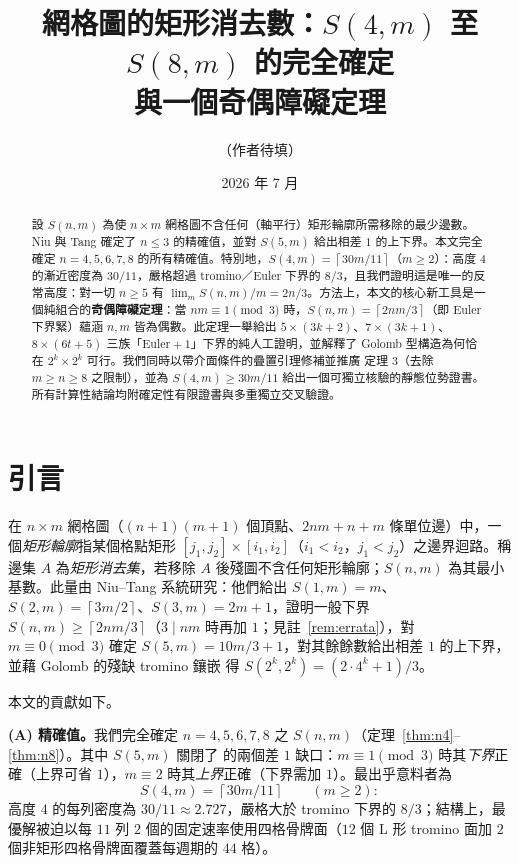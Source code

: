\documentclass[11pt]{ctexart}
\title{網格圖的矩形消去數：$S(4,m)$ 至 $S(8,m)$ 的完全確定\\與一個奇偶障礙定理}
\author{（作者待填）}
\date{2026 年 7 月}
\theoremstyle{definition}
\newcommand{\ceil}[1]{\left\lceil #1 \right\rceil}
\begin{document}
\maketitle

\begin{abstract}
設 $S(n,m)$ 為使 $n\times m$ 網格圖不含任何（軸平行）矩形輪廓所需移除的最少邊數。Niu 與 Tang \cite{NT25} 確定了 $n\le 3$ 的精確值，並對 $S(5,m)$ 給出相差 $1$ 的上下界。本文完全確定 $n=4,5,6,7,8$ 的所有精確值。特別地，$S(4,m)=\ceil{30m/11}$（$m\ge 2$）：高度 $4$ 的漸近密度為 $30/11$，嚴格超過 tromino／Euler 下界的 $8/3$，且我們證明這是唯一的反常高度：對一切 $n\ge 5$ 有 $\lim_m S(n,m)/m = 2n/3$。方法上，本文的核心新工具是一個純組合的\textbf{奇偶障礙定理}：當 $nm\equiv 1\pmod 3$ 時，$S(n,m)=\ceil{2nm/3}$（即 Euler 下界緊）蘊涵 $n,m$ 皆為偶數。此定理一舉給出 $5\times(3k{+}2)$、$7\times(3k{+}1)$、$8\times(6t{+}5)$ 三族「Euler${}+1$」下界的純人工證明，並解釋了 Golomb 型構造為何恰在 $2^k\times 2^k$ 可行。我們同時以帶介面條件的疊置引理修補並推廣 \cite{NT25} 定理 3（去除 $m\ge n\ge 8$ 之限制），並為 $S(4,m)\ge 30m/11$ 給出一個可獨立核驗的靜態位勢證書。所有計算性結論均附確定性有限證書與多重獨立交叉驗證。
\end{abstract}

\section{引言}

在 $n\times m$ 網格圖（$(n{+}1)(m{+}1)$ 個頂點、$2nm+n+m$ 條單位邊）中，一個\emph{矩形輪廓}指某個格點矩形 $[j_1,j_2]\times[i_1,i_2]$（$i_1<i_2$，$j_1<j_2$）之邊界迴路。稱邊集 $A$ 為\emph{矩形消去集}，若移除 $A$ 後殘圖不含任何矩形輪廓；$S(n,m)$ 為其最小基數。此量由 Niu--Tang \cite{NT25} 系統研究：他們給出 $S(1,m)=m$、$S(2,m)=\ceil{3m/2}$、$S(3,m)=2m+1$，證明一般下界 $S(n,m)\ge\ceil{2nm/3}$（$3\mid nm$ 時再加 $1$；見註~\ref{rem:errata}），對 $m\equiv 0\pmod 3$ 確定 $S(5,m)=10m/3+1$，對其餘餘數給出相差 $1$ 的上下界，並藉 Golomb 的殘缺 tromino 鑲嵌 \cite{Golomb54} 得 $S(2^k,2^k)=(2\cdot 4^k+1)/3$。

本文的貢獻如下。

\smallskip
\noindent\textbf{(A) 精確值。}我們完全確定 $n=4,5,6,7,8$ 之 $S(n,m)$（定理~\ref{thm:n4}--\ref{thm:n8}）。其中 $S(5,m)$ 關閉了 \cite{NT25} 的兩個差 $1$ 缺口：$m\equiv 1\pmod 3$ 時其\emph{下界}正確（上界可省 $1$），$m\equiv 2$ 時其\emph{上界}正確（下界需加 $1$）。最出乎意料者為
\[
  S(4,m)=\ceil{30m/11}\qquad(m\ge 2):
\]
高度 $4$ 的每列密度為 $30/11\approx 2.727$，嚴格大於 tromino 下界的 $8/3$；結構上，最優解被迫以每 $11$ 列 $2$ 個的固定速率使用四格骨牌面（$12$ 個 L 形 tromino 面加 $2$ 個非矩形四格骨牌面覆蓋每週期的 $44$ 格）。
\end{document}
